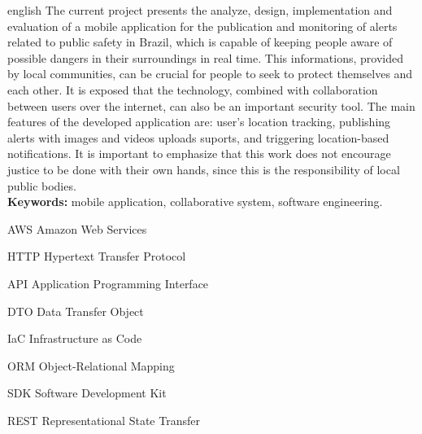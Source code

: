 \documentclass[
	12pt,				%
	openright,			%
	oneside,			%
	a4paper,			%
	english,			%
	french,				%
	spanish,			%
	brazil,				%
	]{lib/abntex2}
\newcommand{\listofquadrosname}{Lista de quadros}
\begin{document}
\begin{resumo}[Abstract]
	\begin{otherlanguage*}{english}
		The current project presents the analyze, design, implementation and evaluation of a mobile application for the publication and monitoring of alerts related to public safety in Brazil, which is capable of keeping people aware of possible dangers in their surroundings in real time. This informations, provided by local communities, can be crucial for people to seek to protect themselves and each other. It is exposed that the technology, combined with collaboration between users over the internet, can also be an important security tool. The main features of the developed application are: user's location tracking, publishing alerts with images and videos uploads suports, and triggering location-based notifications. It is important to emphasize that this work does not encourage justice to be done with their own hands, since this is the responsibility of local public bodies.
		\\
		\textbf{Keywords:} mobile application, collaborative system, software engineering.
	\end{otherlanguage*}
\end{resumo}

\listoffigures*
\cleardoublepage



\begin{siglas}
	\item[AWS] Amazon Web Services
	\item[HTTP] Hypertext Transfer Protocol
	\item[API] Application Programming Interface
	\item[DTO] Data Transfer Object
	\item[IaC] Infrastructure as Code
	\item[ORM] Object-Relational Mapping
	\item[SDK] Software Development Kit
	\item[REST] Representational State Transfer
\end{siglas}
\end{document}
